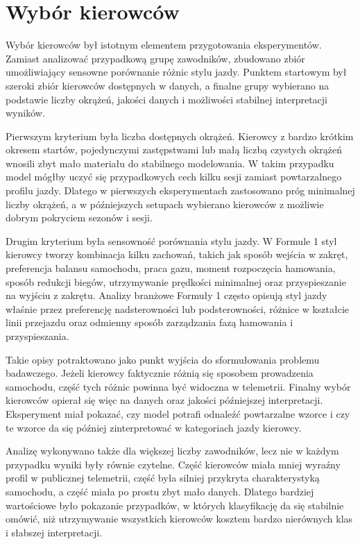 \documentclass[printmode,pl]{mgr}
\begin{document}
\section{Wybór kierowców}

Wybór kierowców był istotnym elementem przygotowania eksperymentów. Zamiast analizować przypadkową grupę zawodników, zbudowano zbiór umożliwiający sensowne porównanie różnic stylu jazdy. Punktem startowym był szeroki zbiór kierowców dostępnych w danych, a finalne grupy wybierano na podstawie liczby okrążeń, jakości danych i możliwości stabilnej interpretacji wyników.

Pierwszym kryterium była liczba dostępnych okrążeń. Kierowcy z bardzo krótkim okresem startów, pojedynczymi zastępstwami lub małą liczbą czystych okrążeń wnosili zbyt mało materiału do stabilnego modelowania. W takim przypadku model mógłby uczyć się przypadkowych cech kilku sesji zamiast powtarzalnego profilu jazdy. Dlatego w pierwszych eksperymentach zastosowano próg minimalnej liczby okrążeń, a w późniejszych setupach wybierano kierowców z możliwie dobrym pokryciem sezonów i sesji.

Drugim kryterium była sensowność porównania stylu jazdy. W Formule 1 styl kierowcy tworzy kombinacja kilku zachowań, takich jak sposób wejścia w zakręt, preferencja balansu samochodu, praca gazu, moment rozpoczęcia hamowania, sposób redukcji biegów, utrzymywanie prędkości minimalnej oraz przyspieszanie na wyjściu z zakrętu. Analizy branżowe Formuły 1 \cite{formula1_racing_id, autosport_driving_style} często opisują styl jazdy właśnie przez preferencję nadsterowności lub podsterowności, różnice w kształcie linii przejazdu oraz odmienny sposób zarządzania fazą hamowania i przyspieszania.

Takie opisy potraktowano jako punkt wyjścia do sformułowania problemu badawczego. Jeżeli kierowcy faktycznie różnią się sposobem prowadzenia samochodu, część tych różnic powinna być widoczna w telemetrii. Finalny wybór kierowców opierał się więc na danych oraz jakości późniejszej interpretacji. Eksperyment miał pokazać, czy model potrafi odnaleźć powtarzalne wzorce i czy te wzorce da się później zinterpretować w kategoriach jazdy kierowcy.

Analizę wykonywano także dla większej liczby zawodników, lecz nie w każdym przypadku wyniki były równie czytelne. Część kierowców miała mniej wyraźny profil w publicznej telemetrii, część była silniej przykryta charakterystyką samochodu, a część miała po prostu zbyt mało danych. Dlatego bardziej wartościowe było pokazanie przypadków, w których klasyfikację da się stabilnie omówić, niż utrzymywanie wszystkich kierowców kosztem bardzo nierównych klas i słabszej interpretacji.
\end{document}
